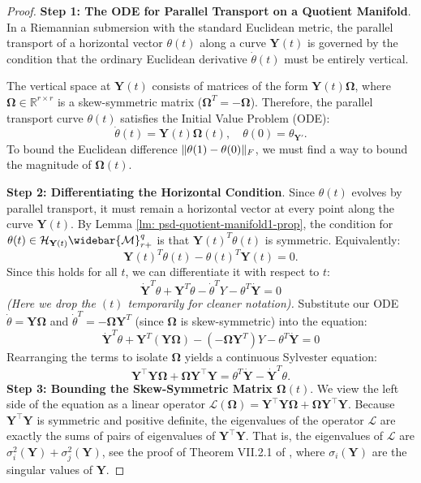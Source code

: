 \documentclass[11pt]{article}
\newcommand{\cH}{\mathcal{H}}
\newcommand{\0}{{\mathbf{0}}}
\newcommand{\1}{{\mathbf{1}}}
\newcommand{\Y}{{\mathbf{Y}}}
\newcommand{\cM}{{\cal M}}
\newcommand{\bOmega}{\boldsymbol{\Omega}}
\newcommand{\F}{{\rm F}}
\begin{document}
{\begin{proof}
{\noindent \bf Step 1: The ODE for Parallel Transport on a Quotient Manifold}.
In a Riemannian submersion with the standard Euclidean metric, the parallel transport of a horizontal vector $\theta(t)$ along a curve $\Y(t)$ is governed by the condition that the ordinary Euclidean derivative $\dot{\theta}(t)$ must be entirely vertical. 

The vertical space at $\Y(t)$ consists of matrices of the form $\Y(t)\bOmega$, where $\bOmega \in \mathbb{R}^{r \times r}$ is a skew-symmetric matrix ($\bOmega^T = -\bOmega$).
Therefore, the parallel transport curve $\theta(t)$ satisfies the Initial Value Problem (ODE):
\[
\dot{\theta}(t) = \Y(t)\bOmega(t), \quad \theta(0) = \theta_{\Y'}.
\]
To bound the Euclidean difference $\|\theta(1) - \theta(0)\|_{\F}$, we must find a way to bound the magnitude of $\bOmega(t)$.

{\noindent \bf Step 2: Differentiating the Horizontal Condition}.
Since $\theta(t)$ evolves by parallel transport, it must remain a horizontal vector at every point along the curve $\Y(t)$. By Lemma \ref{lm: psd-quotient-manifold1-prop}, the condition for $\theta(t) \in  \cH_{\Y(t)}\widebar{\cM}_{r+}^{q}$ is that $\Y(t)^T \theta(t)$ is symmetric. Equivalently:
\[
\Y(t)^T \theta(t) - \theta(t)^T \Y(t) = 0.
\]
Since this holds for all $t$, we can differentiate it with respect to $t$:
\[
\dot{\Y}^T \theta + \Y^T \dot{\theta} - \dot{\theta}^T Y - \theta^T \dot{\Y} = 0
\]
\textit{(Here we drop the $(t)$ temporarily for cleaner notation).} Substitute our ODE $\dot{\theta} = \Y\bOmega$ and $\dot{\theta}^T = -\bOmega \Y^T$ (since $\bOmega$ is skew-symmetric) into the equation:
\[
\dot{\Y}^T \theta + \Y^T (\Y\bOmega) - (-\bOmega \Y^T) Y - \theta^T \dot{\Y} = 0
\]
Rearranging the terms to isolate $\bOmega$ yields a continuous Sylvester equation:
\[
\Y^{\top} \Y \bOmega + \bOmega \Y^{\top} \Y = \theta^T \dot{\Y} - \dot{\Y}^T \theta.
\]
{\noindent \bf Step 3: Bounding the Skew-Symmetric Matrix $\bOmega(t)$}.
We view the left side of the equation as a linear operator $\mathcal{L}(\bOmega) = \Y^{\top} \Y \bOmega + \bOmega \Y^{\top} \Y$.
Because $\Y^{\top} \Y$ is symmetric and positive definite, the eigenvalues of the operator $\mathcal{L}$ are exactly the sums of pairs of eigenvalues of $\Y^{\top} \Y$. That is, the eigenvalues of $\mathcal{L}$ are $\sigma_i^2(\Y) + \sigma_j^2(\Y)$, see the proof of Theorem VII.2.1 of \cite{bhatia2013matrix}, where $\sigma_i(\Y)$ are the singular values of $\Y$.


\end{proof}}
\end{document}

